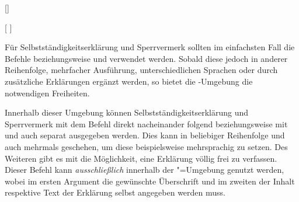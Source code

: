 \begin{Declaration*}{}
\begin{Declaration*}{}
\begin{Declaration*}{}
\begin{Declaration}{[]}
\begin{Declaration}{%
  [%
  ]%
}
\begin{Declaration}{}
\begin{Declaration}{}
\begin{Declaration}{%
}
\begin{Declaration}{%
}
\begin{Declaration}{}
\begin{Declaration}{%
}
\begin{Declaration}{}
\begin{Declaration}{}
\begin{Declaration}{}
\printdeclarationlist%
%
Für Selbstständigkeitserklärung und Sperrvermerk sollten im einfachsten Fall 
die Befehle  beziehungsweise  und 
 verwendet werden. Sobald diese jedoch in anderer Reihenfolge, 
mehrfacher Ausführung, unterschiedlichen Sprachen oder durch zusätzliche 
Erklärungen ergänzt werden, so bietet die -Umgebung 
die notwendigen Freiheiten.

Innerhalb dieser Umgebung können Selbstständigkeitserklärung und Sperrvermerk 
mit dem Befehl  direkt nacheinander folgend beziehungsweise 
mit  und  auch separat ausgegeben werden. 
Dies kann in beliebiger Reihenfolge und auch mehrmals geschehen, um diese 
beispielsweise mehrsprachig zu setzen.
 Des Weiteren gibt es mit  die 
Möglichkeit, eine Erklärung völlig frei zu verfassen. Dieser Befehl kann 
\emph{ausschließlich} innerhalb der "=Umgebung 
genutzt werden, wobei im ersten Argument die gewünschte Überschrift und im 
zweiten der Inhalt respektive Text der Erklärung selbst angegeben werden muss.


\end{Declaration}
\end{Declaration}
\end{Declaration}
\end{Declaration}
\end{Declaration}
\end{Declaration}
\end{Declaration}
\end{Declaration}
\end{Declaration}
\end{Declaration}
\end{Declaration}
\end{Declaration*}
\end{Declaration*}
\end{Declaration*}
